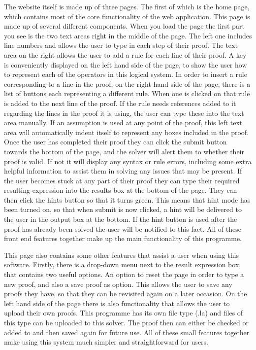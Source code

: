 The website itself is made up of three pages. The first of which is the home page, which contains most of the core functionality of the web application. This page is made up of several different components. When you load the page the first part you see is the two text areas right in the middle of the page. The left one includes line numbers and allows the user to type in each step of their proof. The text area on the right allows the user to add a rule for each line of their proof. A key is conveniently displayed on the left hand side of the page, to show the user how to represent each of the operators in this logical system. In order to insert a rule corresponding to a line in the proof, on the right hand side of the page, there is a list of buttons each representing a different rule. When one is clicked on that rule is added to the next line of the proof. If the rule needs references added to it regarding the lines in the proof it is using, the user can type these into the text area manually. If an assumption is used at any point of the proof, this left text area will automatically indent itself to represent any boxes included in the proof. Once the user has completed their proof they can click the submit button towards the bottom of the page, and the solver will alert them to whether their proof is valid. If not it will display any syntax or rule errors, including some extra helpful information to assist them in solving any issues that may be present. If the user becomes stuck at any part of their proof they can type their required resulting expression into the results box at the bottom of the page. They can then click the hints button so that it turns green. This means that hint mode has been turned on, so that when submit is now clicked, a hint will be delivered to the user in the output box at the bottom. If the hint button is used after the proof has already been solved the user will be notified to this fact. All of these front end features together make up the main functionality of this programme.

This page also contains some other features that assist a user when using this software. Firstly, there is a drop-down menu next to the result expression box, that contains two useful options. An option to reset the page in order to type a new proof, and also a save proof as option. This allows the user to save any proofs they have, so that they can be revisited again on a later occasion. On the left hand side of the page there is also functionality that allows the user to upload their own proofs. This programme has its own file type (.la) and files of this type can be uploaded to this solver. The proof then can either be checked or added to and then saved again for future use. All of these small features together make using this system much simpler and straightforward for users.

